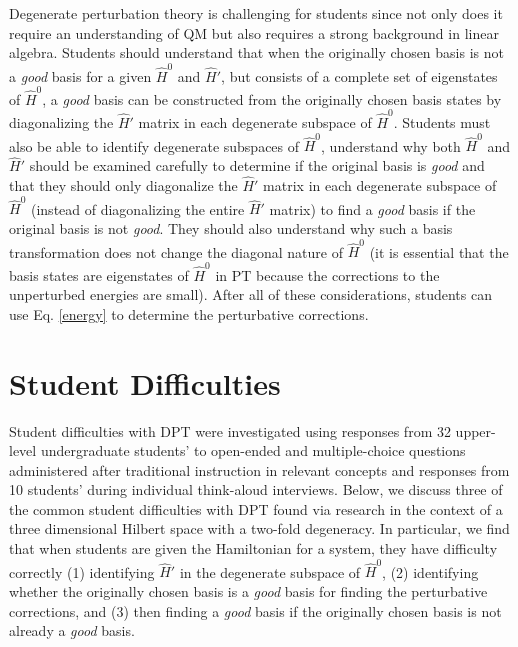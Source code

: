 \documentclass[aps,pra,showpacs,showkeys,twocolumn,groupedaddress]{revtex4-1}
\begin{document}
Degenerate perturbation theory is challenging for students since not only does it require an understanding of QM but also requires a strong background in linear algebra.  Students should understand that when the originally chosen basis is not a {\it good} basis for a given $\hat{H}^0$ and $\hat{H}'$, but consists of a complete set of eigenstates of $\hat{H}^0$, a {\it good} basis can be constructed from the originally chosen basis states by diagonalizing the $\hat{H}'$ matrix in each degenerate subspace of $\hat{H}^0$. Students must also be able to identify degenerate subspaces of $\hat{H}^0$, understand why both $\hat{H}^0$ and $\hat{H}'$ should be examined carefully to determine if the original basis is {\it good} and that they should only diagonalize the $\hat{H}'$ matrix in each degenerate subspace of $\hat{H}^0$ (instead of diagonalizing the entire $\hat{H}'$ matrix) to find a {\it good} basis if the original basis is not {\it good}. They should also understand
 why such a basis transformation does not change the diagonal nature of $\hat{H}^0$ (it is essential that the basis states are eigenstates of $\hat{H}^0$ in PT because the corrections to the unperturbed energies are small). After all of these considerations, students can use Eq. \ref{energy} to determine the perturbative corrections.   

\vspace*{-.19in}

\section{Student Difficulties}
\vspace*{-.11in}

Student difficulties with DPT were investigated using responses from 32 upper-level undergraduate students' to open-ended and multiple-choice questions administered after traditional instruction in relevant concepts and responses from 10 students' during individual think-aloud interviews.  Below, we discuss three of the common student difficulties with DPT found via research in the context of a three dimensional Hilbert space with a two-fold degeneracy. In particular, we find that when students are given the Hamiltonian for a system, they have difficulty correctly (1) identifying $\hat{H}'$ in the degenerate subspace of $\hat{H}^0$, (2) identifying whether the originally chosen basis is a {\it good} basis for finding the perturbative corrections, and (3) then finding a {\it good} basis if the originally chosen basis is not already a {\it good} basis. 
\end{document}

